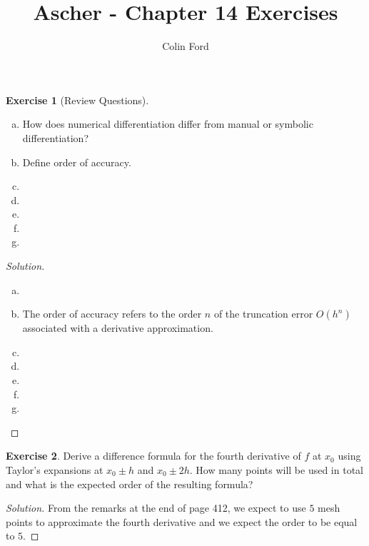 \documentclass[12pt,a4]{article}
\author{Colin Ford}
\title{Ascher - Chapter 14 Exercises}
\date{}
\theoremstyle{definition}
\newtheorem{exercise}{Exercise}
\begin{document}
\maketitle

\begin{exercise}[Review Questions]
	\begin{enumerate}[(a)]
		\item How does numerical differentiation differ from manual or symbolic differentiation?
		
		\item Define order of accuracy.
		
		\item 
	
		\item 
		
		\item 
		
		\item 
		
		\item 
			
	\end{enumerate}
\end{exercise}
\begin{proof}[Solution]
	\begin{enumerate}[(a)]
		\item 
		
		\item The order of accuracy refers to the order $n$ of the truncation error $O(h^n)$ associated with a derivative approximation. 
		
		\item 
		
		\item 
		
		\item 
		
		\item 
		
		\item 
		
	\end{enumerate}
\end{proof}

\begin{exercise}
	Derive a difference formula for the fourth derivative of $f$ at $x_0$ using Taylor's expansions at $x_0 \pm h$ and $x_0 \pm 2 h$. How many points will be used in total and what is the expected order of the resulting formula?
\end{exercise}
\begin{proof}[Solution]
	From the remarks at the end of page 412, we expect to use $5$ mesh points to approximate the fourth derivative and we expect the order to be equal to $5$. 
\end{proof}
\end{document}
